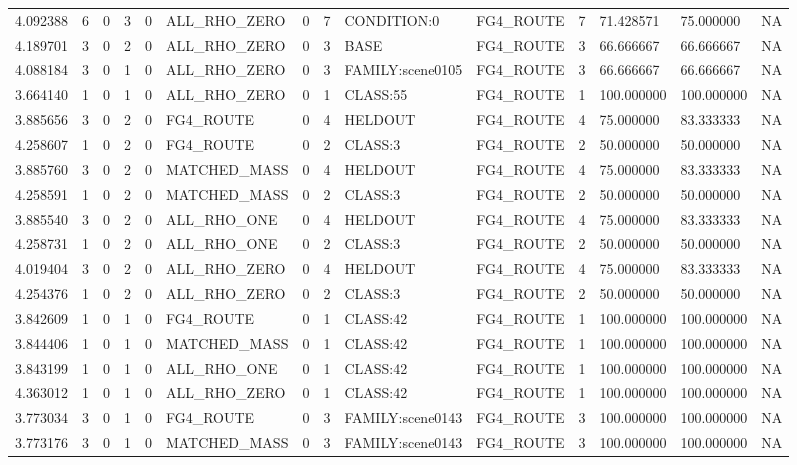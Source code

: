 \begin{tabular}{llllllllllllll}
4.092388 & 6 & 0 & 3 & 0 & ALL\_RHO\_ZERO & 0 & 7 & CONDITION:0 & FG4\_ROUTE & 7 & 71.428571 & 75.000000 & NA \\
4.189701 & 3 & 0 & 2 & 0 & ALL\_RHO\_ZERO & 0 & 3 & BASE & FG4\_ROUTE & 3 & 66.666667 & 66.666667 & NA \\
4.088184 & 3 & 0 & 1 & 0 & ALL\_RHO\_ZERO & 0 & 3 & FAMILY:scene0105 & FG4\_ROUTE & 3 & 66.666667 & 66.666667 & NA \\
3.664140 & 1 & 0 & 1 & 0 & ALL\_RHO\_ZERO & 0 & 1 & CLASS:55 & FG4\_ROUTE & 1 & 100.000000 & 100.000000 & NA \\
3.885656 & 3 & 0 & 2 & 0 & FG4\_ROUTE & 0 & 4 & HELDOUT & FG4\_ROUTE & 4 & 75.000000 & 83.333333 & NA \\
4.258607 & 1 & 0 & 2 & 0 & FG4\_ROUTE & 0 & 2 & CLASS:3 & FG4\_ROUTE & 2 & 50.000000 & 50.000000 & NA \\
3.885760 & 3 & 0 & 2 & 0 & MATCHED\_MASS & 0 & 4 & HELDOUT & FG4\_ROUTE & 4 & 75.000000 & 83.333333 & NA \\
4.258591 & 1 & 0 & 2 & 0 & MATCHED\_MASS & 0 & 2 & CLASS:3 & FG4\_ROUTE & 2 & 50.000000 & 50.000000 & NA \\
3.885540 & 3 & 0 & 2 & 0 & ALL\_RHO\_ONE & 0 & 4 & HELDOUT & FG4\_ROUTE & 4 & 75.000000 & 83.333333 & NA \\
4.258731 & 1 & 0 & 2 & 0 & ALL\_RHO\_ONE & 0 & 2 & CLASS:3 & FG4\_ROUTE & 2 & 50.000000 & 50.000000 & NA \\
4.019404 & 3 & 0 & 2 & 0 & ALL\_RHO\_ZERO & 0 & 4 & HELDOUT & FG4\_ROUTE & 4 & 75.000000 & 83.333333 & NA \\
4.254376 & 1 & 0 & 2 & 0 & ALL\_RHO\_ZERO & 0 & 2 & CLASS:3 & FG4\_ROUTE & 2 & 50.000000 & 50.000000 & NA \\
3.842609 & 1 & 0 & 1 & 0 & FG4\_ROUTE & 0 & 1 & CLASS:42 & FG4\_ROUTE & 1 & 100.000000 & 100.000000 & NA \\
3.844406 & 1 & 0 & 1 & 0 & MATCHED\_MASS & 0 & 1 & CLASS:42 & FG4\_ROUTE & 1 & 100.000000 & 100.000000 & NA \\
3.843199 & 1 & 0 & 1 & 0 & ALL\_RHO\_ONE & 0 & 1 & CLASS:42 & FG4\_ROUTE & 1 & 100.000000 & 100.000000 & NA \\
4.363012 & 1 & 0 & 1 & 0 & ALL\_RHO\_ZERO & 0 & 1 & CLASS:42 & FG4\_ROUTE & 1 & 100.000000 & 100.000000 & NA \\
3.773034 & 3 & 0 & 1 & 0 & FG4\_ROUTE & 0 & 3 & FAMILY:scene0143 & FG4\_ROUTE & 3 & 100.000000 & 100.000000 & NA \\
3.773176 & 3 & 0 & 1 & 0 & MATCHED\_MASS & 0 & 3 & FAMILY:scene0143 & FG4\_ROUTE & 3 & 100.000000 & 100.000000 & NA \\

\end{tabular}
